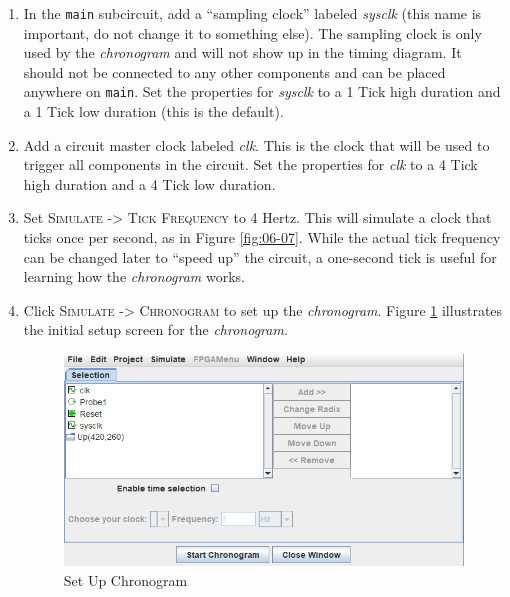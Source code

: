 \begin{enumerate}
	\item In the \lstinline[columns=fixed]|main| subcircuit, add a ``sampling clock'' labeled \textit{sysclk} (this name is important, do not change it to something else). The sampling clock is only used by the \textit{chronogram} and will not show up in the timing diagram. It should not be connected to any other components and can be placed anywhere on \lstinline[columns=fixed]|main|. Set the properties for \textit{sysclk} to a 1 Tick high duration and a 1 Tick low duration (this is the default). 
	\item Add a circuit master clock labeled \textit{clk}. This is the clock that will be used to trigger all components in the circuit. Set the properties for \textit{clk} to a 4 Tick high duration and a 4 Tick low duration.
	\item Set \textsc{Simulate -> Tick Frequency} to 4 Hertz. This will simulate a clock that ticks once per second, as in Figure \ref{fig:06-07}. While the actual tick frequency can be changed later to ``speed up'' the circuit, a one-second tick is useful for learning how the \textit{chronogram} works.
	\item Click \textsc{Simulate -> Chronogram} to set up the \textit{chronogram}. Figure \ref{fig:06-08} illustrates the initial setup screen for the \textit{chronogram}.

	\begin{figure}[H]
		\centering
		\includegraphics[width=\maxwidth{.95\linewidth}]{gfx/06-08}
		\caption{Set Up Chronogram}
		\label{fig:06-08}
	\end{figure}


\end{enumerate}
